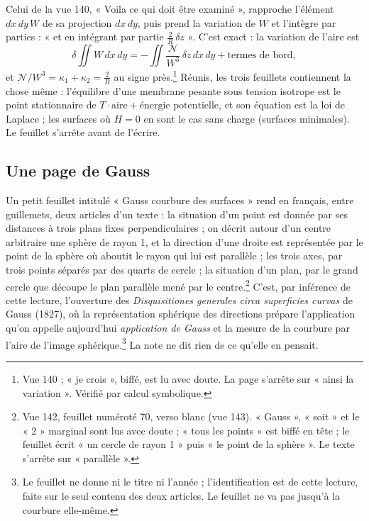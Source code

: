 \documentclass[11pt,a4paper]{article}
\begin{document}
Celui de la vue 140, « Voila ce qui doit être examiné », rapproche l'élément
$dx\,dy\,W$ de sa projection $dx\,dy$, puis prend la variation de $W$ et
l'intègre par parties : « et en intégrant par partie $\frac2R\,\delta z$ ». C'est
exact : la variation de l'aire est
\[
\delta\iint W\,dx\,dy = -\iint \frac{\mathcal{N}}{W^3}\,\delta z\,dx\,dy +
\text{termes de bord},
\]
et $\mathcal{N}/W^3 = \kappa_1+\kappa_2 = \frac2R$ au signe près.\footnote{Vue 140 ;
« je crois », biffé, est lu avec doute. La page s'arrête sur « ainsi la
variation ». Vérifié par calcul symbolique.} Réunis, les trois feuillets
contiennent la chose même : l'équilibre d'une membrane pesante sous tension
isotrope est le point stationnaire de $T\cdot\text{aire} + \text{énergie
potentielle}$, et son équation est la loi de Laplace ; les surfaces où $H = 0$
en sont le cas sans charge (surfaces minimales). Le feuillet s'arrête avant de
l'écrire.

\subsection*{Une page de Gauss}

Un petit feuillet intitulé « Gauss courbure des surfaces » rend en français,
entre guillemets, deux articles d'un texte : la situation d'un point est donnée
par ses distances à trois plans fixes perpendiculaires ; on décrit autour d'un
centre arbitraire une sphère de rayon 1, et la direction d'une droite est
représentée par le point de la sphère où aboutit le rayon qui lui est parallèle ;
les trois axes, par trois points séparés par des quarts de cercle ; la
situation d'un plan, par le grand cercle que découpe le plan parallèle mené par
le centre.\footnote{Vue 142, feuillet numéroté 70, verso blanc (vue 143).
« Gauss », « soit » et le « 2 » marginal sont lus avec doute ; « tous les
points » est biffé en tête ; le feuillet écrit « un cercle de rayon 1 » puis
« le point de la sphère ». Le texte s'arrête sur « parallèle ».} C'est, par
inférence de cette lecture, l'ouverture des \emph{Disquisitiones generales circa
superficies curvas} de Gauss (1827), où la représentation sphérique des
directions prépare l'application qu'on appelle aujourd'hui \emph{application de
Gauss} et la mesure de la courbure par l'aire de l'image sphérique.\footnote{Le
feuillet ne donne ni le titre ni l'année ; l'identification est de cette lecture,
faite sur le seul contenu des deux articles. Le feuillet ne va pas jusqu'à la
courbure elle-même.} La note ne dit rien de ce qu'elle en pensait.
\end{document}

